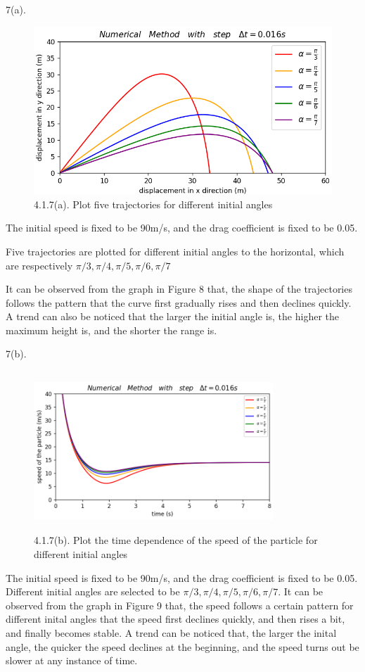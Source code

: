 \documentclass{book}
\begin{document}
\vspace{0.01\textheight}
{\Large 7(a).}
\begin{figure}[H]
  \centering
  \includegraphics[scale=0.6]{./graphs/project4.1.7(a).png}
  \caption{4.1.7(a). Plot five trajectories for different initial angles}
\end{figure}
The initial speed is fixed to be 90m/s, and the drag coefficient is fixed to be 0.05.

Five trajectories are plotted for different initial angles to the horizontal, which are respectively {$\pi/3,\pi/4,\pi/5,\pi/6,\pi/7$}

It can be observed from the graph in Figure 8 that, the shape of the trajectories follows the pattern that the curve first gradually rises and then declines quickly.
A trend can also be noticed that the larger the initial angle is, the higher the maximum height is, and the shorter the range is.

\vspace{0.01\textheight}
{\Large 7(b).}
\begin{figure}[H]
  \centering
  \includegraphics[width=9cm,height=6cm]{./graphs/project4.1.7(b).png}
  \caption{4.1.7(b). Plot the time dependence of the speed of the particle for different initial angles}
\end{figure}
The initial speed is fixed to be 90m/s, and the drag coefficient is fixed to be 0.05.
Different initial angles are selected to be {$\pi/3,\pi/4,\pi/5,\pi/6,\pi/7$}.
It can be observed from the graph in Figure 9 that, the speed follows a certain pattern for different inital angles that the speed first declines quickly, and then rises a bit, and finally becomes stable.
A trend can be noticed that, the larger the inital angle, the quicker the speed declines at the beginning, and the speed turns out be slower at any instance of time.
\end{document}
